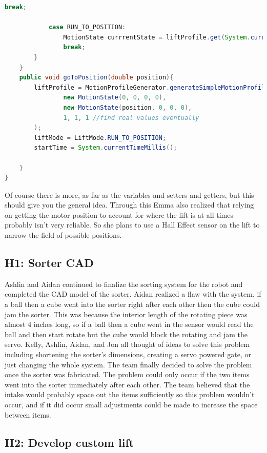 \documentclass{article}
\begin{document}
\begin{lstlisting}[language=Java]
                break;

            case RUN_TO_POSITION:
                MotionState currrentState = liftProfile.get(System.currentTimeMillis() - startTime);
                break;
        }
    }
    public void goToPosition(double position){
        liftProfile = MotionProfileGenerator.generateSimpleMotionProfile(
                new MotionState(0, 0, 0, 0),
                new MotionState(position, 0, 0, 0),
                1, 1, 1 //find real values eventually
        );
        liftMode = LiftMode.RUN_TO_POSITION;
        startTime = System.currentTimeMillis();

    }
}
\end{lstlisting}
Of course there is more, as far as the variables and setters and getters, but this should give you the general idea. Through this Emma also realized that relying on getting the motor position to account for where the lift is at all times probably isn't very reliable. So she plans to use a Hall Effect sensor on the lift to narrow the field of possible positions.
\subsection{H1: Sorter CAD}

Ashlin and Aidan continued to finalize the sorting system for the robot and completed the CAD model of the sorter. Aidan realized a flaw with the system, if a ball then a cube went into the sorter right after each other then the cube could jam the sorter. This was because the interior length of the rotating piece was almost 4 inches long, so if a ball then a cube went in the sensor would read the ball and then start rotate but the cube would block the rotating and jam the servo. Kelly, Ashlin, Aidan, and Jon all thought of ideas to solve this problem including shortening the sorter's dimensions, creating a servo powered gate, or just changing the whole system. The team finally decided to solve the problem once the sorter was fabricated. The problem could only occur if the two items went into the sorter immediately after each other. The team believed that the intake would probably space out the items sufficiently so this problem wouldn't occur, and if it did occur small adjustments could be made to increase the space between items.

\subsection{H2: Develop custom lift}
\end{document}
